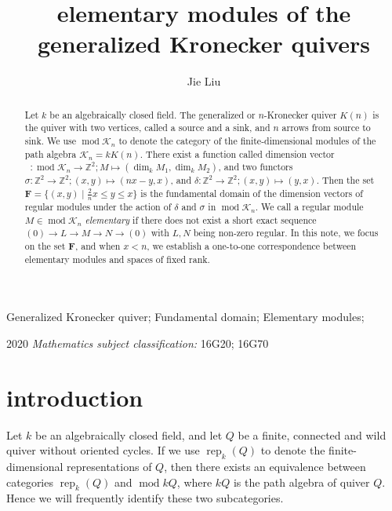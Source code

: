 \documentclass[a4paper,12pt]{amsart}
\author{Jie Liu}
\title{ elementary modules of the
generalized Kronecker quivers }
\newcommand{\cK}{\mathcal{K}}
\DeclareMathOperator{\rep}{rep}
\DeclareMathOperator{\modd}{mod}
\DeclareMathOperator{\dimu}{\underline{dim}}
\begin{document}
\rmfamily


\thispagestyle{empty}

\maketitle

\begin{abstract}
Let $k$ be an algebraically closed field. The generalized or $n$-Kronecker quiver $K(n)$ is the  quiver with two vertices, called a source and a sink, and $n$ arrows from source to sink.  We use  $\modd\cK_n$ to denote the category of the finite-dimensional modules of the path algebra  $\cK_n=kK(n)$.  There exist  a function called dimension vector  $\dimu: \modd \cK_n\rightarrow \mathbb{Z}^2; M \mapsto (\dim_k M_1, \dim_k M_2 )$, and two  functors $\sigma: \mathbb{Z}^2 \rightarrow \mathbb{Z}^2; (x,y)\mapsto (nx-y,x)$, and $\delta: \mathbb{Z}^2\rightarrow \mathbb{Z}^2;(x,y)\mapsto (y,x)$.  Then the set  $\mathbf{F}=\{(x,y)\mid \frac{2}{n}x\leq y\leq x\}$ is the  fundamental domain of the dimension vectors of  regular modules  under the action of   $\delta$ and $\sigma$ in  $\modd\cK_n$.  We call a regular module $M\in \modd\cK_n$ \textit{elementary} if there does not exist a short exact sequence $(0)\rightarrow L\rightarrow M\rightarrow N\rightarrow (0)$ with $L,N$ being non-zero regular.  In this note, we focus on the set $\mathbf{F}$,  and when $x<n$, we establish a one-to-one correspondence between  elementary modules and  spaces of fixed rank.
 
\end{abstract}

\providecommand{\keywords}[1]
{
  \small	
  \textbf{} #1
}
\keywords{Generalized Kronecker quiver; Fundamental domain; Elementary modules;}

2020  \textit{Mathematics subject classification:} 	16G20; 	16G70


\section{introduction}


 Let $k$ be an algebraically closed  field, and let $Q$ be a finite, connected and wild quiver without  oriented cycles. If we use  $\rep_k(Q)$ to  denote the finite-dimensional representations of $Q$,  then there  exists an equivalence between categories  $\rep_k(Q)$ and  $\modd kQ$, where $kQ$ is the path algebra of quiver $Q$. Hence  we will frequently identify these two subcategories. 
\end{document}
